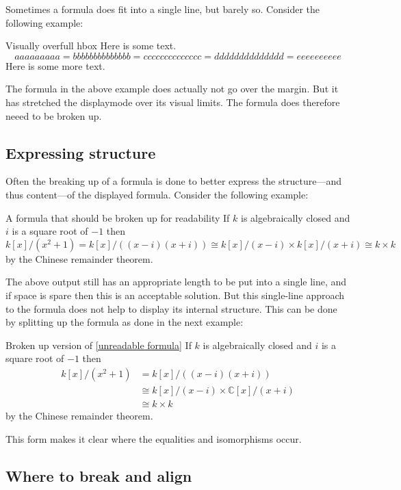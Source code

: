 Sometimes a formula does fit into a single line, but barely so.
Consider the following example:
\begin{showlatex}{Visually overfull hbox}
Here is some text.
\[
  aaaaaaaaa = bbbbbbbbbbbbbb = cccccccccccccc = dddddddddddddd = eeeeeeeeee
\]
Here is some more text.
\end{showlatex}
The formula in the above example does actually not go over the margin.
But it has stretched the displaymode over its visual limits.
The formula does therefore neeed to be broken up.

\subsection{Expressing structure}

Often the breaking up of a formula is done to better express the structure---and thus content---of the displayed formula.
Consider the following example:
\begin{showlatex}[label={unreadable formula}]{A formula that should be broken up for readability}
If $k$ is algebraically closed and $i$ is a square root of $-1$ then
\[
  k[x]/(x^2 + 1)
  =
  k[x]/( (x - i) (x + i) )
  \cong
  k[x]/(x - i) \times k[x]/(x + i)
  \cong
  k \times k
\]
by the Chinese remainder theorem.
\end{showlatex}
The above output still has an appropriate length to be put into a single line, and if space is spare then this is an acceptable solution.
But this single-line approach to the formula does not help to display its internal structure.
This can be done by splitting up the formula as done in the next example:
\begin{showlatex}{Broken up version of \cref*{unreadable formula}}
If $k$ is algebraically closed and $i$ is a square root of $-1$ then
\begin{align*}
  k[x]/(x^2 + 1)
  &=
  k[x]/( (x - i) (x + i) )
  \\
  &\cong
  k[x]/(x - i) \times \mathbb{C}[x]/(x + i)
  \\
  &\cong
  k \times k
\end{align*}
by the Chinese remainder theorem.
\end{showlatex}
This form makes it clear where the equalities and isomorphisms occur.



\subsection{Where to break and align}

